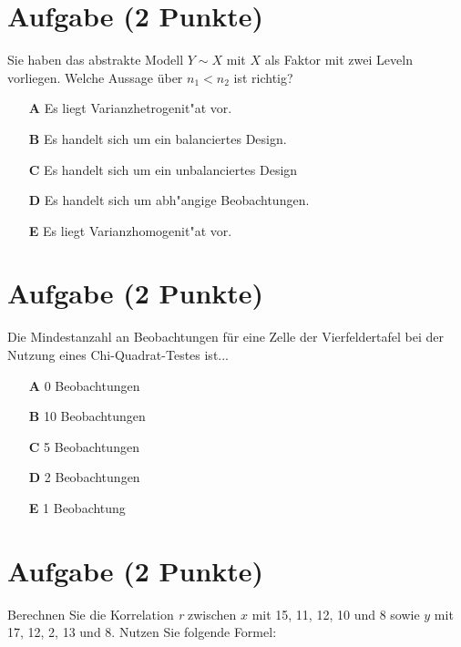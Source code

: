 \documentclass[a4paper, 10pt]{scrartcl}\usepackage[]{graphicx}\usepackage[]{xcolor}
\begin{document}
\section{Aufgabe \hfill (2 Punkte)}




Sie haben das abstrakte Modell $Y \sim X$ mit $X$ als Faktor mit zwei
Leveln vorliegen. Welche Aussage {\"u}ber $n_1 < n_2$ ist richtig?



\begin{enumerate}
\item [\textbf{A} \msquare] Es liegt Varianzhetrogenit{"a}t vor.
\item [\textbf{B} \msquare] Es handelt sich um ein balanciertes Design.
\item [\textbf{C} \msquare] Es handelt sich um ein unbalanciertes Design
\item [\textbf{D} \msquare] Es handelt sich um abh{"a}ngige Beobachtungen.
\item [\textbf{E} \msquare] Es liegt Varianzhomogenit{"a}t vor.
\end{enumerate} 

\section{Aufgabe \hfill (2 Punkte)}

Die Mindestanzahl an Beobachtungen f{\"u}r eine Zelle der Vierfeldertafel bei
der Nutzung eines Chi-Quadrat-Testes ist...



\begin{enumerate}
\item [\textbf{A} \msquare] 0 Beobachtungen
\item [\textbf{B} \msquare] 10 Beobachtungen
\item [\textbf{C} \msquare] 5 Beobachtungen
\item [\textbf{D} \msquare] 2 Beobachtungen
\item [\textbf{E} \msquare] 1 Beobachtung
\end{enumerate} 

\section{Aufgabe \hfill (2 Punkte)}




Berechnen Sie die Korrelation \textit{r} zwischen $x$ mit 15, 11, 12, 10 und 8 sowie $y$ mit 17, 12, 2, 13 und 8.  Nutzen Sie folgende Formel:
\end{document}
